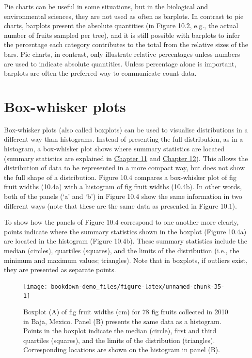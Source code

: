 \documentclass[
  openany]{krantz}
\begin{document}
Pie charts can be useful in some situations, but in the biological and environmental sciences, they are not used as often as barplots.
In contrast to pie charts, barplots present the absolute quantities (in Figure 10.2, e.g., the actual number of fruits sampled per tree), and it is still possible with barplots to infer the percentage each category contributes to the total from the relative sizes of the bars.
Pie charts, in contrast, only illustrate relative percentages unless numbers are used to indicate absolute quantities.
Unless percentage alone is important, barplots are often the preferred way to communicate count data.

\hypertarget{box-whisker-plots}{%
\section{Box-whisker plots}\label{box-whisker-plots}}

Box-whisker plots (also called boxplots) can be used to visualise distributions in a different way than histograms.
Instead of presenting the full distribution, as in a histogram, a box-whisker plot shows where summary statistics are located (summary statistics are explained in \protect\hyperlink{Chapter_11}{Chapter 11} and \protect\hyperlink{Chapter_12}{Chapter 12}).
This allows the distribution of data to be represented in a more compact way, but does not show the full shape of a distribution.
Figure 10.4 compares a box-whisker plot of fig fruit widths (10.4a) with a histogram of fig fruit widths (10.4b).
In other words, both of the panels (`a' and `b') in Figure 10.4 show the same information in two different ways (note that these are the same data as presented in Figure 10.1).

To show how the panels of Figure 10.4 correspond to one another more clearly, points indicate where the summary statistics shown in the boxplot (Figure 10.4a) are located in the histogram (Figure 10.4b).
These summary statistics include the median (circles), quartiles (squares), and the limits of the distribution (i.e., the minimum and maximum values; triangles).
Note that in boxplots, if outliers exist, they are presented as separate points.

\begin{figure}
\texttt{[image: bookdown-demo\_files/figure-latex/unnamed-chunk-35-1]} \caption{Boxplot (A) of fig fruit widths (cm) for 78 fig fruits collected in 2010 in Baja, Mexico. Panel (B) presents the same data as a histogram. Points in the boxplot indicate the median (circle), first and third quartiles (squares), and the limits of the distribution (triangles). Corresponding locations are shown on the histogram in panel (B).}\label{fig:unnamed-chunk-35}
\end{figure}
\end{document}
